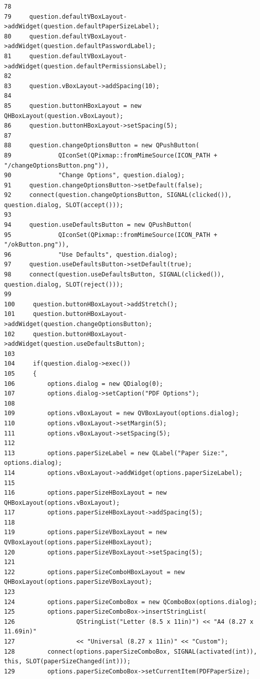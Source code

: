 \begin{verbatim}
78 
79     question.defaultVBoxLayout->addWidget(question.defaultPaperSizeLabel);
80     question.defaultVBoxLayout->addWidget(question.defaultPasswordLabel);
81     question.defaultVBoxLayout->addWidget(question.defaultPermissionsLabel);
82 
83     question.vBoxLayout->addSpacing(10);
84 
85     question.buttonHBoxLayout = new QHBoxLayout(question.vBoxLayout);
86     question.buttonHBoxLayout->setSpacing(5);
87 
88     question.changeOptionsButton = new QPushButton(
89             QIconSet(QPixmap::fromMimeSource(ICON_PATH + "/changeOptionsButton.png")),
90             "Change Options", question.dialog);
91     question.changeOptionsButton->setDefault(false);
92     connect(question.changeOptionsButton, SIGNAL(clicked()), question.dialog, SLOT(accept()));
93 
94     question.useDefaultsButton = new QPushButton(
95             QIconSet(QPixmap::fromMimeSource(ICON_PATH + "/okButton.png")),
96             "Use Defaults", question.dialog);
97     question.useDefaultsButton->setDefault(true);
98     connect(question.useDefaultsButton, SIGNAL(clicked()), question.dialog, SLOT(reject()));
99 
100     question.buttonHBoxLayout->addStretch();
101     question.buttonHBoxLayout->addWidget(question.changeOptionsButton);
102     question.buttonHBoxLayout->addWidget(question.useDefaultsButton);
103 
104     if(question.dialog->exec())
105     {
106         options.dialog = new QDialog(0);
107         options.dialog->setCaption("PDF Options");
108 
109         options.vBoxLayout = new QVBoxLayout(options.dialog);
110         options.vBoxLayout->setMargin(5);
111         options.vBoxLayout->setSpacing(5);
112 
113         options.paperSizeLabel = new QLabel("Paper Size:", options.dialog);
114         options.vBoxLayout->addWidget(options.paperSizeLabel);
115 
116         options.paperSizeHBoxLayout = new QHBoxLayout(options.vBoxLayout);
117         options.paperSizeHBoxLayout->addSpacing(5);
118 
119         options.paperSizeVBoxLayout = new QVBoxLayout(options.paperSizeHBoxLayout);
120         options.paperSizeVBoxLayout->setSpacing(5);
121 
122         options.paperSizeComboHBoxLayout = new QHBoxLayout(options.paperSizeVBoxLayout);
123 
124         options.paperSizeComboBox = new QComboBox(options.dialog);
125         options.paperSizeComboBox->insertStringList(
126                 QStringList("Letter (8.5 x 11in)") << "A4 (8.27 x 11.69in)"
127                 << "Universal (8.27 x 11in)" << "Custom");
128         connect(options.paperSizeComboBox, SIGNAL(activated(int)), this, SLOT(paperSizeChanged(int)));
129         options.paperSizeComboBox->setCurrentItem(PDFPaperSize);

\end{verbatim}
